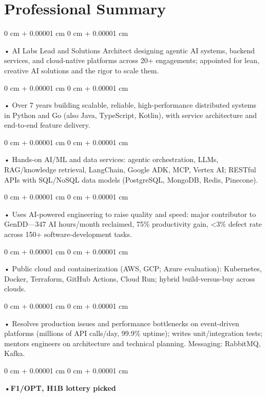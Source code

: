 \documentclass[10pt, letterpaper]{article}
\newenvironment{onecolentry}{
    \begin{adjustwidth}{
        0 cm + 0.00001 cm
    }{
        0 cm + 0.00001 cm
    }
}{
    \end{adjustwidth}
} %
\begin{document}
    \section{Professional Summary}
        \vspace{2 pt }
        \begin{onecolentry}
            • AI Labs Lead and Solutions Architect designing agentic AI systems, backend services, and cloud-native platforms across 20+ engagements; appointed for lean, creative AI solutions and the rigor to scale them.
        \end{onecolentry}
        \begin{onecolentry}
            • Over 7 years building scalable, reliable, high-performance distributed systems in Python and Go (also Java, TypeScript, Kotlin), with service architecture and end-to-end feature delivery.
        \end{onecolentry}
        \begin{onecolentry}
            • Hands-on AI/ML and data services: agentic orchestration, LLMs, RAG/knowledge retrieval, LangChain, Google ADK, MCP, Vertex AI; RESTful APIs with SQL/NoSQL data models (PostgreSQL, MongoDB, Redis, Pinecone).
        \end{onecolentry}
        \begin{onecolentry}
            • Uses AI-powered engineering to raise quality and speed: major contributor to GenDD---347 AI hours/month reclaimed, 75\% productivity gain, \textless3\% defect rate across 150+ software-development tasks.
        \end{onecolentry}
        \begin{onecolentry}
            • Public cloud and containerization (AWS, GCP; Azure evaluation): Kubernetes, Docker, Terraform, GitHub Actions, Cloud Run; hybrid build-versus-buy across clouds.
        \end{onecolentry}
        \begin{onecolentry}
            • Resolves production issues and performance bottlenecks on event-driven platforms (millions of API calls/day, 99.9\% uptime); writes unit/integration tests; mentors engineers on architecture and technical planning. Messaging: RabbitMQ, Kafka.
        \end{onecolentry}
        \begin{onecolentry}
                \textbf{•F1/OPT, H1B lottery picked}
        \end{onecolentry}

    \vspace{2 pt }
\end{document}

